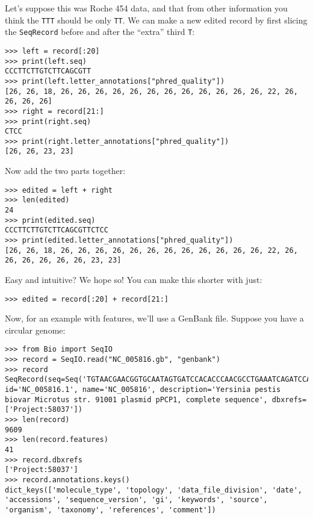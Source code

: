 \noindent Let's suppose this was Roche 454 data, and that from other information
you think the \texttt{TTT} should be only \texttt{TT}. We can make a new edited
record by first slicing the \verb|SeqRecord| before and after the ``extra''
third \texttt{T}:

\begin{verbatim}
>>> left = record[:20]
>>> print(left.seq)
CCCTTCTTGTCTTCAGCGTT
>>> print(left.letter_annotations["phred_quality"])
[26, 26, 18, 26, 26, 26, 26, 26, 26, 26, 26, 26, 26, 26, 26, 22, 26, 26, 26, 26]
>>> right = record[21:]
>>> print(right.seq)
CTCC
>>> print(right.letter_annotations["phred_quality"])
[26, 26, 23, 23]
\end{verbatim}

\noindent Now add the two parts together:

\begin{verbatim}
>>> edited = left + right
>>> len(edited)
24
>>> print(edited.seq)
CCCTTCTTGTCTTCAGCGTTCTCC
>>> print(edited.letter_annotations["phred_quality"])
[26, 26, 18, 26, 26, 26, 26, 26, 26, 26, 26, 26, 26, 26, 26, 22, 26, 26, 26, 26, 26, 26, 23, 23]
\end{verbatim}

\noindent Easy and intuitive? We hope so! You can make this shorter with just:

\begin{verbatim}
>>> edited = record[:20] + record[21:]
\end{verbatim}

Now, for an example with features, we'll use a GenBank file.
Suppose you have a circular genome:

\begin{verbatim}
>>> from Bio import SeqIO
>>> record = SeqIO.read("NC_005816.gb", "genbank")
>>> record
SeqRecord(seq=Seq('TGTAACGAACGGTGCAATAGTGATCCACACCCAACGCCTGAAATCAGATCCAGG...CTG'), id='NC_005816.1', name='NC_005816', description='Yersinia pestis biovar Microtus str. 91001 plasmid pPCP1, complete sequence', dbxrefs=['Project:58037'])
>>> len(record)
9609
>>> len(record.features)
41
>>> record.dbxrefs
['Project:58037']
>>> record.annotations.keys()
dict_keys(['molecule_type', 'topology', 'data_file_division', 'date', 'accessions', 'sequence_version', 'gi', 'keywords', 'source', 'organism', 'taxonomy', 'references', 'comment'])
\end{verbatim}

